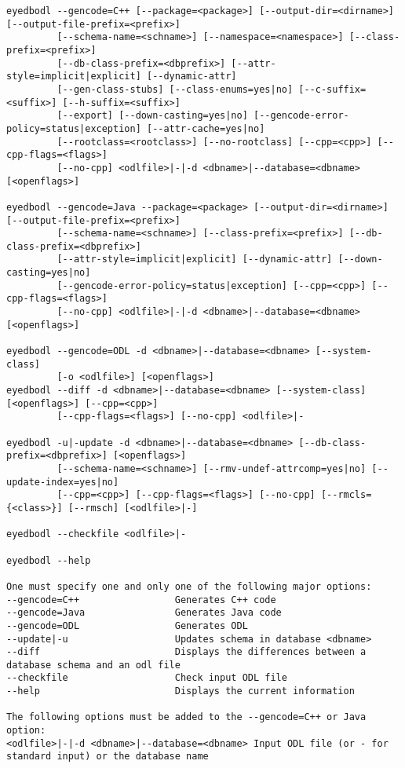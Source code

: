 \begin{verbatim}
eyedbodl --gencode=C++ [--package=<package>] [--output-dir=<dirname>] [--output-file-prefix=<prefix>]
         [--schema-name=<schname>] [--namespace=<namespace>] [--class-prefix=<prefix>]
         [--db-class-prefix=<dbprefix>] [--attr-style=implicit|explicit] [--dynamic-attr]
         [--gen-class-stubs] [--class-enums=yes|no] [--c-suffix=<suffix>] [--h-suffix=<suffix>]
         [--export] [--down-casting=yes|no] [--gencode-error-policy=status|exception] [--attr-cache=yes|no]
         [--rootclass=<rootclass>] [--no-rootclass] [--cpp=<cpp>] [--cpp-flags=<flags>]
         [--no-cpp] <odlfile>|-|-d <dbname>|--database=<dbname> [<openflags>]

eyedbodl --gencode=Java --package=<package> [--output-dir=<dirname>] [--output-file-prefix=<prefix>]
         [--schema-name=<schname>] [--class-prefix=<prefix>] [--db-class-prefix=<dbprefix>]
         [--attr-style=implicit|explicit] [--dynamic-attr] [--down-casting=yes|no]
         [--gencode-error-policy=status|exception] [--cpp=<cpp>] [--cpp-flags=<flags>]
         [--no-cpp] <odlfile>|-|-d <dbname>|--database=<dbname> [<openflags>]

eyedbodl --gencode=ODL -d <dbname>|--database=<dbname> [--system-class]
         [-o <odlfile>] [<openflags>]
eyedbodl --diff -d <dbname>|--database=<dbname> [--system-class] [<openflags>] [--cpp=<cpp>]
         [--cpp-flags=<flags>] [--no-cpp] <odlfile>|-

eyedbodl -u|-update -d <dbname>|--database=<dbname> [--db-class-prefix=<dbprefix>] [<openflags>]
         [--schema-name=<schname>] [--rmv-undef-attrcomp=yes|no] [--update-index=yes|no]
         [--cpp=<cpp>] [--cpp-flags=<flags>] [--no-cpp] [--rmcls={<class>}] [--rmsch] [<odlfile>|-]

eyedbodl --checkfile <odlfile>|-

eyedbodl --help

One must specify one and only one of the following major options:
--gencode=C++                 Generates C++ code
--gencode=Java                Generates Java code
--gencode=ODL                 Generates ODL
--update|-u                   Updates schema in database <dbname>
--diff                        Displays the differences between a database schema and an odl file
--checkfile                   Check input ODL file
--help                        Displays the current information

The following options must be added to the --gencode=C++ or Java option:
<odlfile>|-|-d <dbname>|--database=<dbname> Input ODL file (or - for standard input) or the database name


\end{verbatim}
